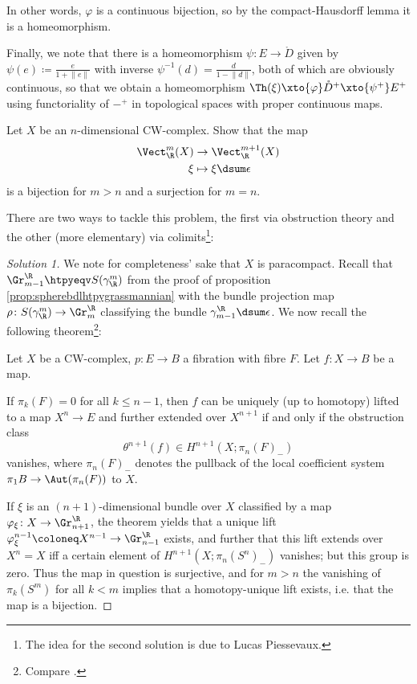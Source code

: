 \begin{solution}
\begin{enumerate}
			In other words, $\varphi$ is a continuous bijection, so by the compact-Hausdorff lemma it is a homeomorphism.

			Finally, we note that there is a homeomorphism $\psi\colon E \to \mathring{D}$ given by $\psi(e) \coloneq \frac{e}{1 + \lVert e\rVert}$ with inverse $\psi^{-1}(d) = \frac{d}{1 - \lVert d\rVert}$, both of which are obviously continuous, so that we obtain a homeomorphism $\Th(\xi) \xto{\varphi} \mathring{D}^+ \xto{\psi^+} E^+$ using functoriality of ${{-}}^+$ in topological spaces with proper continuous maps.
			\qedhere
	\end{enumerate}
\end{solution}

\begin{exercise}
	Let $X$ be an $n$-dimensional CW-complex.
	Show that the map
	\begin{align*}
		\Vect_\R^m(X) &\to \Vect_\R^{m + 1}(X) \\
		\xi &\mapsto \xi \dsum \epsilon
	\end{align*}
	is a bijection for $m > n$ and a surjection for $m = n$.
\end{exercise}
There are two ways to tackle this problem, the first via obstruction theory and the other (more elementary) via colimits\footnote{The idea for the second solution is due to Lucas Piessevaux.}:
\begin{proof}[Solution 1]
	We note for completeness' sake that $X$ is paracompact.
	Recall that $\Gr_{m - 1}^\R \htpyeqv S(\gamma_\R^m)$ from the proof of proposition \ref{prop:spherebdlhtpygrassmannian} with the bundle projection map $\rho\colon S(\gamma_\R^m) \to \Gr_m^\R$ classifying the bundle $\gamma_{m - 1}^\R \dsum \epsilon$.
	We now recall the following theorem\footnote{Compare \cite[Theorem 7.37]{davis_lecture_2001}.}:
	\begin{theorem}
		Let $X$ be a CW-complex, $p\colon E \to B$ a fibration with fibre $F$.
		Let $f\colon X \to B$ be a map.

		If $\pi_k(F) = 0$ for all $k \leq n - 1$, then $f$ can be uniquely (up to homotopy) lifted to a map $X^n \to E$ and further extended over $X^{n + 1}$ if and only if the obstruction class
		\begin{equation*}
			\theta^{n + 1}(f) \in H^{n + 1}(X; \pi_n(F)_{-})
		\end{equation*}
		vanishes, where $\pi_n(F)_{-}$ denotes the pullback of the local coefficient system $\pi_1 B \to \Aut(\pi_n(F))$ to $X$.
	\end{theorem}
	If $\xi$ is an $(n + 1)$-dimensional bundle over $X$ classified by a map $\varphi_{\xi}\colon X \to \Gr_{n + 1}^\R$, the theorem yields that a unique lift $\varphi_\xi^{n - 1}\coloneq X^{n - 1} \to \Gr_{n - 1}^\R$ exists, and further that this lift extends over $X^n = X$ iff a certain element of $H^{n + 1}(X; \pi_n(S^n)_{-})$ vanishes; but this group is zero.
	Thus the map in question is surjective, and for $m > n$ the vanishing of $\pi_k(S^m)$ for all $k < m$ implies that a homotopy-unique lift exists, i.e. that the map is a bijection.
\end{proof}
